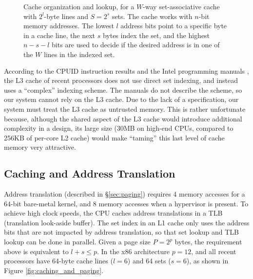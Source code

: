 \begin{figure}[hbtp]
  \caption{
    Cache organization and lookup, for a $W$-way set-associative cache with
    $2^{l}$-byte lines and $S = 2^{s}$ sets. The cache works with $n$-bit
    memory addresses. The lowest $l$ address bits point to a specific byte in a
    cache line, the next $s$ bytes index the set, and the highest $n - s - l$
    bits are used to decide if the desired address is in one of the $W$ lines
    in the indexed set.
  }
  \label{fig:cpu_cache}
\end{figure}

According to the CPUID instruction results and the Intel programming manuals
\cite{intel2013manual}, the L3 cache of recent processors does not use direct
set indexing, and instead uses a ``complex'' indexing scheme. The manuals do
not describe the scheme, so our system cannot rely on the L3 cache. Due to the
lack of a specification, our system must treat the L3 cache as untrusted
memory. This is rather unfortunate because, although the shared aspect of the
L3 cache would introduce additional complexity in a design, its large size
(30MB on high-end CPUs, compared to 256KB of per-core L2 cache) would make
``taming'' this last level of cache memory very attractive.

\subsection{Caching and Address Translation}

Address translation (described in \S \ref{sec:paging}) requires 4 memory
accesses for a 64-bit bare-metal kernel, and 8 memory accesses when a
hypervisor is present. To achieve high clock speeds, the CPU caches address
translations in a TLB (translation look-aside buffer). The set index in an L1
cache only uses the address bits that are not impacted by address translation,
so that set lookup and TLB lookup can be done in parallel. Given a page size
$P = 2^{p}$ bytes, the requirement above is equivalent to $l + s \le p$. In the
x86 architecture $p = 12$, and all recent processors have 64-byte cache lines
($l = 6$) and 64 sets ($s = 6$), as shown in Figure
\ref{fig:caching_and_paging}.

